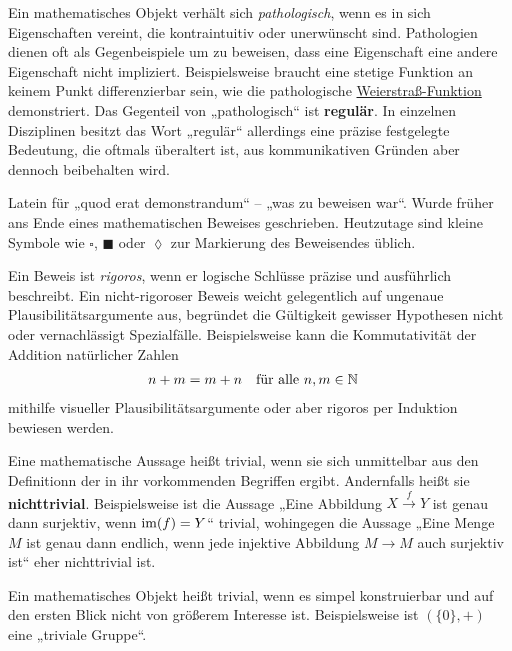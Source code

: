 \begin{description}[labelindent=0pt, leftmargin=0pt]
    \item[Pathologisch:] Ein mathematisches Objekt verhält sich \emph{pathologisch}, wenn es in sich Eigenschaften vereint, die kontraintuitiv oder unerwünscht sind. Pathologien dienen oft als Gegenbeispiele um zu beweisen, dass eine Eigenschaft eine andere Eigenschaft nicht impliziert. Beispielsweise braucht eine stetige Funktion an keinem Punkt differenzierbar sein, wie die pathologische \href{https://de.wikipedia.org/wiki/Weierstrass-Funktion}{Weierstraß-Funktion} demonstriert. Das Gegenteil von „pathologisch“ ist \textbf{regulär}. In einzelnen Disziplinen besitzt das Wort „regulär“ allerdings eine präzise festgelegte Bedeutung, die oftmals überaltert ist, aus kommunikativen Gründen aber dennoch beibehalten wird.

    \item[QED:] Latein für „quod erat demonstrandum“ -- „was zu beweisen war“. Wurde früher ans Ende eines mathematischen Beweises geschrieben. Heutzutage sind kleine Symbole wie $\square$, $\blacksquare$ oder $\lozenge$ zur Markierung des Beweisendes üblich.
    
    \item[Rigoros:] Ein Beweis ist \emph{rigoros}, wenn er logische Schlüsse präzise und ausführlich beschreibt. Ein nicht-rigoroser Beweis weicht gelegentlich auf ungenaue Plausibilitätsargumente aus, begründet die Gültigkeit gewisser Hypothesen nicht oder vernachlässigt Spezialfälle. Beispielsweise kann die Kommutativität der Addition natürlicher Zahlen
    \begin{align*}
        n+m & = m+n && \text{für alle}\ n,m\in \mathbb N
    \end{align*}
    mithilfe visueller Plausibilitätsargumente oder aber rigoros per Induktion bewiesen werden.

    \item[Trivial:] Eine mathematische Aussage heißt trivial, wenn sie sich unmittelbar aus den Definitionn der in ihr vorkommenden Begriffen ergibt. Andernfalls heißt sie \textbf{nichttrivial}. Beispielsweise ist die Aussage „Eine Abbildung $X\xrightarrow{f} Y$ ist genau dann surjektiv, wenn $\operatorname{im}(f)=Y$“ trivial, wohingegen die Aussage „Eine Menge $M$ ist genau dann endlich, wenn jede injektive Abbildung $M\to M$ auch surjektiv ist“ eher nichttrivial ist.
    
    Ein mathematisches Objekt heißt trivial, wenn es simpel konstruierbar und auf den ersten Blick nicht von größerem Interesse ist. Beispielsweise ist $(\{0\},+)$ eine „triviale Gruppe“. 


\end{description}
